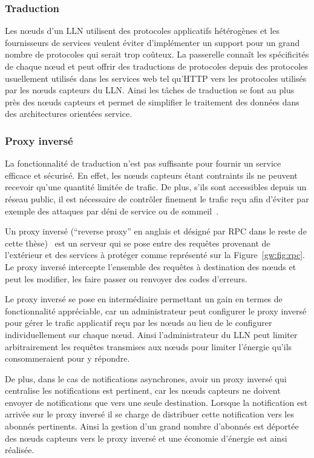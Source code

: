 \subsubsection{Traduction}
\label{gw:traduction}

Les nœuds d'un \ac{LLN} utilisent des protocoles applicatifs hétérogènes et les fournisseurs de services veulent éviter d'implémenter un support pour un grand nombre de protocoles qui serait trop coûteux.
La passerelle connaît les spécificités de chaque nœud et peut offrir des traductions de protocoles depuis des protocoles usuellement utilisés dans les services web tel qu'\ac{HTTP} vers les protocoles utilisés par les nœuds capteurs du \ac{LLN}.
Ainsi les tâches de traduction se font au plus près des nœuds capteurs et permet de simplifier le traitement des données dans des architectures orientées service.

\subsubsection{Proxy inversé}
\label{gw:reverse_proxy}

La fonctionnalité de traduction n'est pas suffisante pour fournir un service efficace et sécurisé.
En effet, les nœuds capteurs étant contraints ils ne peuvent recevoir qu'une quantité limitée de trafic.
De plus, s'ils sont accessibles depuis un réseau public, il est nécessaire de contrôler finement le trafic reçu afin d'éviter par exemple des attaques par déni de service ou de sommeil~\cite{wessels2001web,raymond2008denial}.

Un proxy inversé (``reverse proxy'' en anglais et désigné par \ac{RPC} dans le reste de cette thèse)~\cite{reese2008nginx} est un serveur qui se pose entre des requêtes provenant de l'extérieur et des services à protéger comme représenté sur la Figure~\ref{gw:fig:rpc}.
Le proxy inversé intercepte l'ensemble des requêtes à destination des nœuds et peut les modifier, les faire passer ou renvoyer des codes d'erreurs.

Le proxy inversé se pose en intermédiaire permettant un gain en termes de fonctionnalité  appréciable, car un administrateur peut configurer le proxy inversé pour gérer le trafic applicatif reçu par les nœuds au lieu de le configurer individuellement sur chaque nœud.
Ainsi l'administrateur du \ac{LLN} peut limiter arbitrairement les requêtes transmises aux nœuds pour limiter l'énergie qu'ils consommeraient pour y répondre.

De plus, dans le cas de notifications asynchrones, avoir un proxy inversé qui centralise les notifications est pertinent, car les nœuds capteurs ne doivent envoyer de notifications que vers une seule destination.
Lorsque la notification est arrivée sur le proxy inversé il se charge de distribuer cette notification vers les abonnés pertinents.
Ainsi la gestion d'un grand nombre d'abonnés est déportée des nœuds capteurs vers le proxy inversé et une économie d'énergie est ainsi réalisée.

